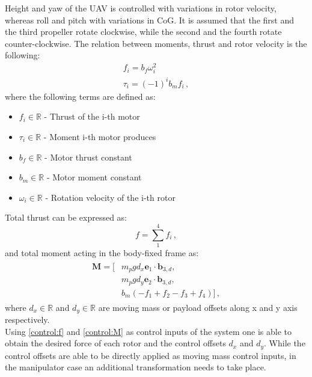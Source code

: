\indent Height and yaw of the UAV is controlled with variations in rotor velocity, whereas roll and pitch with variations in CoG. It is assumed that the first and the third propeller rotate clockwise, while the second and the fourth rotate counter-clockwise. The relation between moments, thrust and rotor velocity is the following:
\begin{gather}
	f_i = b_f \omega_{i}^2 \label{force}\\
	\tau_i = (-1)^i b_m f_i \, ,
\end{gather}
where the following terms are defined as:
\begin{itemize}
	\item $f_i \in \mathbb{R}$ - Thrust of the i-th motor
	
	\item $\tau_i \in \mathbb{R}$ - Moment i-th motor produces
	
	\item $b_f \in \mathbb{R}$ - Motor thrust constant
	
	\item $b_m \in \mathbb{R}$ - Motor moment constant
	
	\item $\omega_i \in \mathbb{R}$ - Rotation velocity of the i-th rotor
\end{itemize}
Total thrust can be expressed as:
\begin{equation}
	f = \sum_{1}^{4}f_i \, , \label{control:f}
\end{equation}
and total moment acting in the body-fixed frame as:
\begin{align}
	\begin{split} \label{control:M}
	\textbf{M} = [&m_{p}gd_x  \textbf{e}_1 \cdot \textbf{b}_{3,d} , \\
	&m_{p}gd_y \textbf{e}_2 \cdot \textbf{b}_{3,d}, \\
	&b_m(-f_1 + f_2 - f_3 + f_4)] \, ,
	\end{split}
\end{align}
where $d_x \in \mathbb{R}$ and $d_y \in \mathbb{R}$ are moving mass or payload offsets along x and y axis respectively. \\
Using \eqref{control:f} and \eqref{control:M} as control inputs of the system one is able to obtain the desired force of each rotor and the control offsets $d_x$ and $d_y$. While the control offsets are able to be directly applied as moving mass control inputs, in the manipulator case an additional transformation needs to take place. \\
